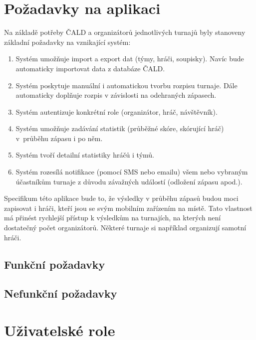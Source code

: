 \documentclass[thesis=B,czech]{FITthesis}[2012/06/26]
\begin{document}

\section{Požadavky na aplikaci}

\indent

Na základě potřeby ČALD a organizátorů jednotlivých turnajů byly stanoveny základní požadavky na vznikající systém:

\begin{enumerate}
\item Systém umožňuje import a export dat (týmy, hráči, soupisky). Navíc bude automaticky importovat data z databáze ČALD.
\item Systém poskytuje manuální i automatickou tvorbu rozpisu turnaje. Dále automaticky doplňuje rozpis v závislosti na odehraných zápasech.
\item Systém autentizuje konkrétní role (organizátor, hráč, návštěvník).
\item Systém umožňuje zadávání statistik (průběžné skóre, skórující hráč) v~prů\-běhu zápasu i po něm.
\item Systém tvoří detailní statistiky hráčů i týmů.
\item Systém rozesílá notifikace (pomocí SMS nebo emailu) všem nebo vybraným účastníkům turnaje z důvodu závažných událostí (odložení zápasu apod.).
\end{enumerate}

\medskip

Specifikum této aplikace bude to, že výsledky v průběhu zápasů budou moci zapisovat i hráči, kteří jsou se svým mobilním zařízením na místě.
Tato vlastnost má přinést rychlejší přístup k výsledkům na turnajích, na kterých není dostatečný počet organizátorů.
Některé turnaje si například organizují samotní hráči.

\subsection{Funkční požadavky}

\subsection{Nefunkční požadavky}


\section{Uživatelské role}
\end{document}
